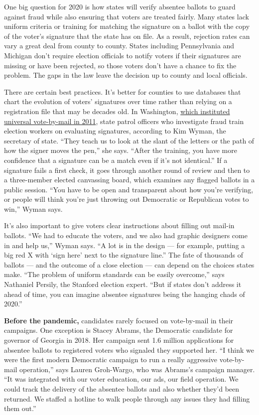 One big question for 2020 is how states will verify absentee ballots to
guard against fraud while also ensuring that voters are treated fairly.
Many states lack uniform criteria or training for matching the signature
on a ballot with the copy of the voter's signature that the state has on
file. As a result, rejection rates can vary a great deal from county to
county. States including Pennsylvania and Michigan don't require
election officials to notify voters if their signatures are missing or
have been rejected, so those voters don't have a chance to fix the
problem. The gaps in the law leave the decision up to county and local
officials.

There are certain best practices. It's better for counties to use
databases that chart the evolution of voters' signatures over time
rather than relying on a registration file that may be decades old. In
Washington,
\href{https://crosscut.com/2020/04/washingtons-successful-vote-mail-system-wasnt-built-overnight}{which
instituted universal vote-by-mail in 2011}, state patrol officers who
investigate fraud train election workers on evaluating signatures,
according to Kim Wyman, the secretary of state. ``They teach us to look
at the slant of the letters or the path of how the signer moves the
pen,'' she says. ``After the training, you have more confidence that a
signature can be a match even if it's not identical.'' If a signature
fails a first check, it goes through another round of review and then to
a three-member elected canvassing board, which examines any flagged
ballots in a public session. ``You have to be open and transparent about
how you're verifying, or people will think you're just throwing out
Democratic or Republican votes to win,'' Wyman says.

It's also important to give voters clear instructions about filling out
mail-in ballots. ``We had to educate the voters, and we also had graphic
designers come in and help us,'' Wyman says. ``A lot is in the design
--- for example, putting a big red X with `sign here' next to the
signature line.'' The fate of thousands of ballots --- and the outcome
of a close election --- can depend on the choices states make. ``The
problem of uniform standards can be easily overcome,'' says Nathaniel
Persily, the Stanford election expert. ``But if states don't address it
ahead of time, you can imagine absentee signatures being the hanging
chads of 2020.''

\textbf{Before the pandemic,} candidates rarely focused on vote-by-mail
in their campaigns. One exception is Stacey Abrams, the Democratic
candidate for governor of Georgia in 2018. Her campaign sent 1.6 million
applications for absentee ballots to registered voters who signaled they
supported her. ``I think we were the first modern Democratic campaign to
run a really aggressive vote-by-mail operation,'' says Lauren
Groh-Wargo, who was Abrams's campaign manager. ``It was integrated with
our voter education, our ads, our field operation. We could track the
delivery of the absentee ballots and also whether they'd been returned.
We staffed a hotline to walk people through any issues they had filling
them out.''

